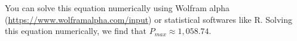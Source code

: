 \documentclass[12pt]{article}
\begin{document}
\begin{enumerate}
{    You can solve this equation numerically using Wolfram alpha (\url{https://www.wolframalpha.com/input}) or statistical softwares like R.
    Solving this equation numerically, we find that $P_{max} \approx 1,058.74$.
    }

\end{enumerate}
\end{document}
